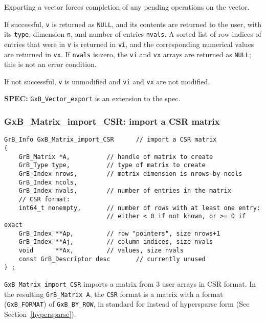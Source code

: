 \documentclass[12pt]{article}
\begin{document}
Exporting a vector forces completion of any pending operations on the vector.

If successful, \verb'v' is returned as \verb'NULL', and its contents are
returned to the user, with its \verb'type', dimension \verb'n', and number of
entries \verb'nvals'.  A sorted list of row indices of entries that were in
\verb'v' is returned in \verb'vi', and the corresponding numerical values are
returned in \verb'vx'.  If \verb'nvals' is zero, the \verb'vi' and \verb'vx'
arrays are returned as \verb'NULL'; this is not an error condition.

If not successful, \verb'v' is unmodified and \verb'vi' and \verb'vx' are
not modified.

\begin{spec}
{\bf SPEC:} \verb'GxB_Vector_export' is an extension to the spec.
\end{spec}

\newpage
\subsubsection{{\sf GxB\_Matrix\_import\_CSR:} import a CSR matrix}
\label{matrix_import_csr}

\begin{mdframed}[userdefinedwidth=6in]
{\footnotesize
\begin{verbatim}
GrB_Info GxB_Matrix_import_CSR      // import a CSR matrix
(
    GrB_Matrix *A,          // handle of matrix to create
    GrB_Type type,          // type of matrix to create
    GrB_Index nrows,        // matrix dimension is nrows-by-ncols
    GrB_Index ncols,
    GrB_Index nvals,        // number of entries in the matrix
    // CSR format:
    int64_t nonempty,       // number of rows with at least one entry:
                            // either < 0 if not known, or >= 0 if exact
    GrB_Index **Ap,         // row "pointers", size nrows+1
    GrB_Index **Aj,         // column indices, size nvals
    void      **Ax,         // values, size nvals
    const GrB_Descriptor desc       // currently unused
) ;
\end{verbatim}
} \end{mdframed}

\verb'GxB_Matrix_import_CSR' imports a matrix from 3 user arrays in CSR format.
In the resulting \verb'GrB_Matrix A', the \verb'CSR' format is a matrix with a
format (\verb'GxB_FORMAT') of \verb'GxB_BY_ROW', in standard for instead of
hypersparse form (See Section~\ref{hypersparse}).
\end{document}
